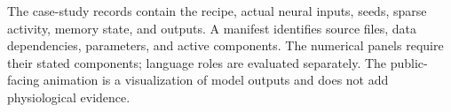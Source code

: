The case-study records contain the recipe, actual neural inputs, seeds, sparse activity, memory state, and outputs. A manifest identifies source files, data dependencies, parameters, and active components. The numerical panels require their stated components; language roles are evaluated separately. The public-facing animation is a visualization of model outputs and does not add physiological evidence.
